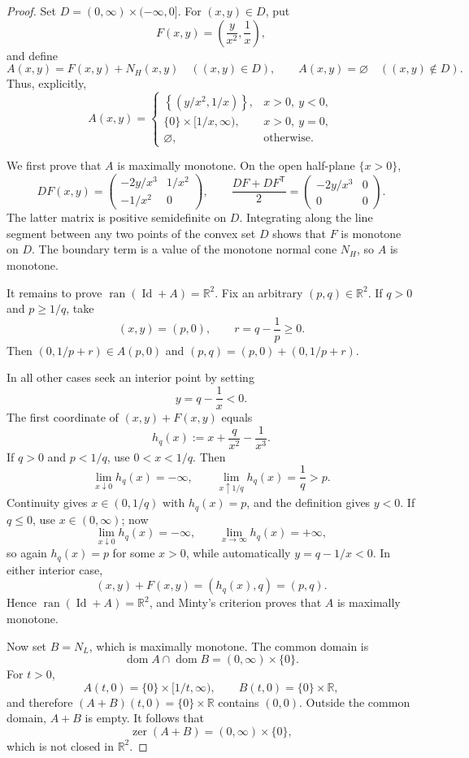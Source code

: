 \documentclass[11pt]{article}
\newcommand{\R}{\mathbb R}
\newcommand{\dom}{\operatorname{dom}}
\newcommand{\ran}{\operatorname{ran}}
\newcommand{\zer}{\operatorname{zer}}
\newcommand{\Id}{\operatorname{Id}}
\begin{document}
\begin{proof}
Set $D=(0,\infty)\times(-\infty,0]$.  For $(x,y)\in D$, put
\[
 F(x,y)=\left(\frac{y}{x^2},\frac1x\right),
\]
and define
\[
 A(x,y)=F(x,y)+N_H(x,y)\quad ((x,y)\in D),
 \qquad A(x,y)=\varnothing\quad ((x,y)\notin D).
\]
Thus, explicitly,
\[
 A(x,y)=
 \begin{cases}
 \left\{(y/x^2,1/x)\right\},&x>0,\ y<0,\\
 \{0\}\times[1/x,\infty),&x>0,\ y=0,\\
 \varnothing,&\text{otherwise}.
 \end{cases}
\]

We first prove that $A$ is maximally monotone.  On the open half-plane
$\{x>0\}$,
\[
 DF(x,y)=
 \begin{pmatrix}
 -2y/x^3&1/x^2\\
 -1/x^2&0
 \end{pmatrix},
 \qquad
 \frac{DF+DF^{\mathsf T}}2=
 \begin{pmatrix}
 -2y/x^3&0\\0&0
 \end{pmatrix}.
\]
The latter matrix is positive semidefinite on $D$.  Integrating along the
line segment between any two points of the convex set $D$ shows that $F$ is
monotone on $D$.  The boundary term is a value of the monotone normal cone
$N_H$, so $A$ is monotone.

It remains to prove $\ran(\Id+A)=\R^2$.  Fix an arbitrary $(p,q)\in\R^2$.
If $q>0$ and $p\ge1/q$, take
\[
 (x,y)=(p,0),\qquad r=q-\frac1p\ge0.
\]
Then $(0,1/p+r)\in A(p,0)$ and
$(p,q)=(p,0)+(0,1/p+r)$.

In all other cases seek an interior point by setting
\[
 y=q-\frac1x<0.
\]
The first coordinate of $(x,y)+F(x,y)$ equals
\[
 h_q(x):=x+\frac{q}{x^2}-\frac1{x^3}.
\]
If $q>0$ and $p<1/q$, use $0<x<1/q$.  Then
\[
 \lim_{x\downarrow0}h_q(x)=-\infty,
 \qquad
 \lim_{x\uparrow1/q}h_q(x)=\frac1q>p.
\]
Continuity gives $x\in(0,1/q)$ with $h_q(x)=p$, and the definition gives
$y<0$.  If $q\le0$, use $x\in(0,\infty)$; now
\[
 \lim_{x\downarrow0}h_q(x)=-\infty,
 \qquad
 \lim_{x\to\infty}h_q(x)=+\infty,
\]
so again $h_q(x)=p$ for some $x>0$, while automatically
$y=q-1/x<0$.  In either interior case,
\[
 (x,y)+F(x,y)=(h_q(x),q)=(p,q).
\]
Hence $\ran(\Id+A)=\R^2$, and Minty's criterion proves that $A$ is maximally
monotone.

Now set $B=N_L$, which is maximally monotone.  The common domain is
\[
 \dom A\cap\dom B=(0,\infty)\times\{0\}.
\]
For $t>0$,
\[
 A(t,0)=\{0\}\times[1/t,\infty),
 \qquad B(t,0)=\{0\}\times\R,
\]
and therefore $(A+B)(t,0)=\{0\}\times\R$ contains $(0,0)$.  Outside the
common domain, $A+B$ is empty.  It follows that
\[
 \zer(A+B)=(0,\infty)\times\{0\},
\]
which is not closed in $\R^2$.
\end{proof}
\end{document}

